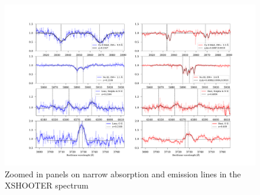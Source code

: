 \documentclass[a4paper,fleqn,usenatbib]{mnras}
\begin{document}

\begin{figure}
	\centering
	\caption{Zoomed in panels on narrow absorption and emission lines in the XSHOOTER spectrum
	\label{fig:spec_panels}}
	\includegraphics[width=\textwidth]{spec_panels.pdf}
\end{figure}

\end{document}
